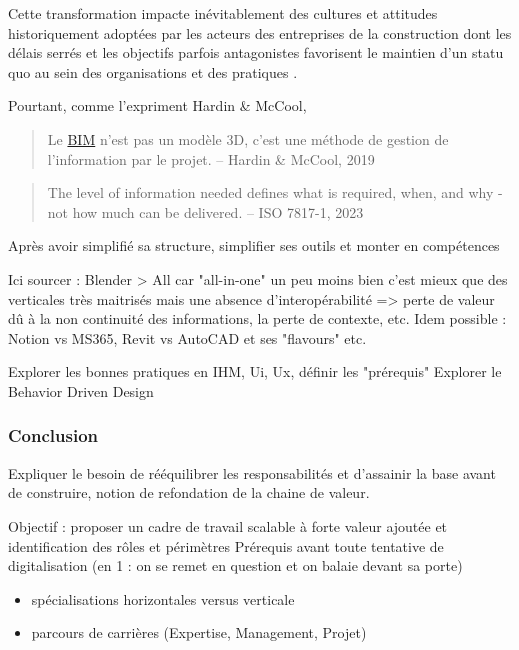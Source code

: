 \documentclass[a4paper,12pt]{article}
\begin{document}
Cette transformation impacte inévitablement des cultures et attitudes historiquement adoptées par les acteurs des entreprises de la construction dont les délais serrés et les objectifs parfois antagonistes favorisent le maintien d’un statu quo au sein des organisations et des pratiques \autocite{lindbladBIMImplementationOrganisational2015,paulagordogregorioContinuiteInformationnelleDans2023}. 

Pourtant, comme l'expriment Hardin \& McCool,
\begin{quote}
Le \protect\hyperlink{gls-1}{\label{gls-1-use-10}BIM} n’est pas un modèle 3D, c’est une méthode de gestion de l’information par le projet. -- Hardin \& McCool, 2019 \autocite{hardinBIMAppliqueAu2019}
\end{quote}


\begin{quote}
The level of information needed defines what is required, when, and why - not how much can be delivered. -- ISO 7817-1, 2023 \autocite{ModelisationInformationsConstruction2024} 
\end{quote}

Après avoir simplifié sa structure, simplifier ses outils et monter en compétences

Ici sourcer : Blender > All car "all-in-one" un peu moins bien c'est mieux que des verticales très maitrisés mais une absence d'interopérabilité => perte de valeur dû à la non continuité des informations, la perte de contexte, etc.
Idem possible : Notion vs MS365, Revit vs AutoCAD et ses "flavours"
etc.

Explorer les bonnes pratiques en IHM, Ui, Ux, définir les "prérequis" 
Explorer le Behavior Driven Design 
\subsubsection{Conclusion}
\label{sec:org8dd1a7a}
Expliquer le besoin de rééquilibrer les responsabilités et d'assainir la base avant de construire, notion de refondation de la chaine de valeur.

Objectif : proposer un cadre de travail scalable à forte valeur ajoutée et identification des rôles et périmètres 
Prérequis avant toute tentative de digitalisation (en 1 : on se remet en question et on balaie devant sa porte)
\begin{itemize}
\item spécialisations horizontales versus verticale
\item parcours de carrières (Expertise, Management, Projet)
\end{itemize}
\end{document}
